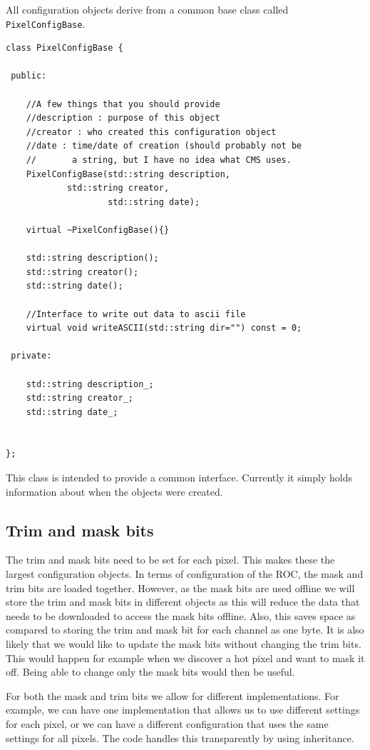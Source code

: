 All configuration objects derive from a common base class called
{\tt PixelConfigBase}.

\begin{verbatim}
class PixelConfigBase {

 public:

    //A few things that you should provide
    //description : purpose of this object
    //creator : who created this configuration object
    //date : time/date of creation (should probably not be
    //       a string, but I have no idea what CMS uses.
    PixelConfigBase(std::string description,
		    std::string creator,
                    std::string date);

    virtual ~PixelConfigBase(){}

    std::string description();
    std::string creator();
    std::string date();

    //Interface to write out data to ascii file
    virtual void writeASCII(std::string dir="") const = 0;

 private:

    std::string description_;
    std::string creator_;
    std::string date_;
     

};
\end{verbatim}

This class is intended to provide a common interface. Currently it simply
holds information about when the objects were created. 


\subsection{Trim and mask bits}

The trim and mask bits need to be set for each pixel. This
makes these the largest configuration objects. In terms
of configuration of the ROC, the mask and trim bits are loaded
together. However, as the mask bits are used offline we will
store the trim and mask bits in different objects 
as this will reduce the data that needs to be downloaded
to access the mask bits offline. Also, this saves space
as compared to storing the trim and mask bit for each 
channel as one byte. It is also likely that we would
like to update the mask bits without changing the trim bits.
This would happen for example when we discover a hot pixel
and want to mask it off. Being able to change only the
mask bits would then be useful.

For both the mask and trim bits we allow for different implementations.
For example, we can have one implementation that allows us
to use different settings for each pixel, or we can have a different
configuration that uses the same settings for all pixels. The code
handles this transparently by using inheritance. 


